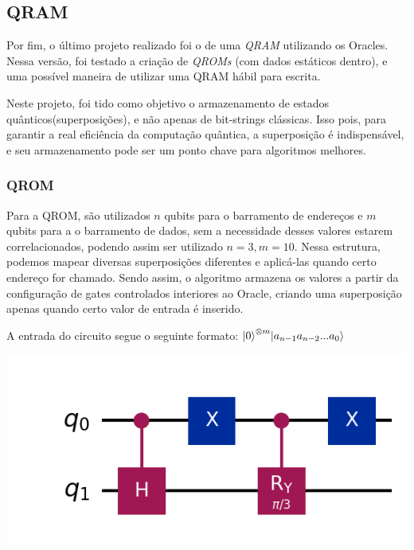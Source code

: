 \documentclass{article}
\begin{document}
\subsection{QRAM} \label{qram}

Por fim, o último projeto realizado foi o de uma \emph{QRAM} utilizando os Oracles. Nessa versão, foi testado a criação de \emph{QROMs} (com dados estáticos dentro), e uma possível maneira de utilizar uma QRAM hábil para escrita.

Neste projeto, foi tido como objetivo o armazenamento de estados quânticos(superposições), e não apenas de bit-strings clássicas. Isso pois, para garantir a real eficiência da computação quântica, a superposição é indispensável, e seu armazenamento pode ser um ponto chave para algoritmos melhores.

\subsubsection{QROM}

Para a QROM, são utilizados $n$ qubits para o barramento de endereços e $m$ qubits para a o barramento de dados, sem a necessidade desses valores estarem correlacionados, podendo assim ser utilizado $n=3, m=10$. Nessa estrutura, podemos mapear diversas superposições diferentes e aplicá-las quando certo endereço for chamado. Sendo assim, o algoritmo armazena os valores a partir da configuração de gates controlados interiores ao Oracle, criando uma superposição apenas quando certo valor de entrada é inserido.

A entrada do circuito segue o seguinte formato: ${\mathinner{|{0}\rangle}^{\otimes m}} {\mathinner{|{a_{n-1} a_{n-2} ... a_0}\rangle}}$

\begin{center}
	\includegraphics[scale=0.5]{qrom_1.png}
	\label{fig:qrom}
\end{center}
\end{document}
